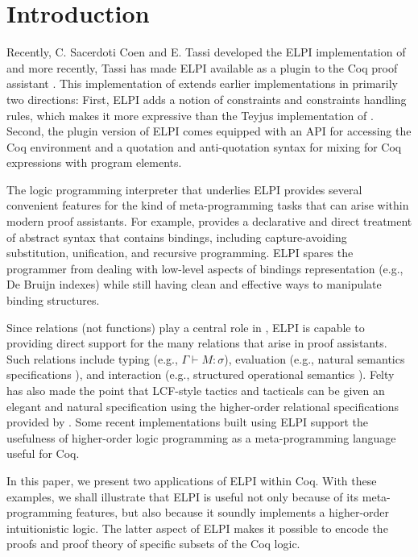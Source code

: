 \section{Introduction}
\label{sec:intro}

Recently, C. Sacerdoti Coen and E. Tassi developed the ELPI
implementation \cite{dunchev15lpar} of \lP \cite{miller12proghol} and
more recently, Tassi has made ELPI available as a plugin to the Coq
proof assistant \cite{tassi18coqpl}.  This implementation of \lP
extends earlier implementations in primarily two directions:  First,
ELPI adds a notion of constraints and constraints handling rules, which makes it more expressive than
the Teyjus implementation \cite{nadathur99cade} of \lP. Second, the
plugin version of ELPI comes equipped with an API for accessing the
Coq environment and a quotation and anti-quotation syntax for mixing
for Coq expressions with \lP program elements.

The logic programming interpreter that underlies ELPI provides several
convenient features for the kind of meta-programming tasks that can
arise within modern proof assistants.  For example, \lP provides a
declarative and direct treatment of abstract syntax that contains
bindings, including capture-avoiding substitution,
unification, and recursive programming.  ELPI spares the
programmer from dealing with low-level aspects of bindings
representation (e.g., De Bruijn indexes) while still having clean and
effective ways to manipulate binding structures.

Since relations (not functions) play a central role in \lP, ELPI is
capable to providing direct support for the many relations that arise
in proof assistants.  Such relations include typing (e.g.,
$\Gamma\vdash M\colon\sigma$), evaluation (e.g., natural semantics specifications
\cite{kahn87stacs,hannan93jfp}), and interaction (e.g., structured
operational semantics \cite{plotkin81,milner89book}).  Felty has also
made the point that LCF-style tactics and tacticals can be given an
elegant and natural specification using the higher-order relational
specifications provided by \lP \cite{felty93jar}.  Some recent
implementations built using ELPI
\cite{coen19mscs,tassi18coqpl,tassi19itp} support the usefulness of
higher-order logic programming as a meta-programming language useful
for Coq.

In this paper, we present two applications of ELPI within Coq. With
these examples, we shall illustrate that ELPI is useful not only
because of its meta-programming features,
but also because it soundly
implements a higher-order intuitionistic logic.  The latter aspect of
ELPI makes it possible to encode the proofs and proof theory of
specific subsets of the Coq logic.


